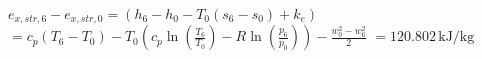 \( e_{x,str,6} - e_{x,str,0} = (h_6 - h_0 - T_0(s_6 - s_0) + k_e) \)  
\( = c_p(T_6 - T_0) - T_0(c_p \ln \left(\frac{T_6}{T_0}\right) - R \ln \left(\frac{p_6}{p_0}\right)) - \frac{w_0^2 - w_6^2}{2} \)  
\( = 120.802 \, \text{kJ/kg} \)